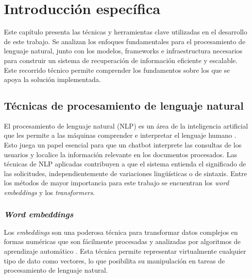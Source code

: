 \chapter{Introducción específica} %

\label{Chapter2}


Este capítulo presenta las técnicas y herramientas clave utilizadas en el 
desarrollo de este trabajo. Se analizan los enfoques fundamentales para el procesamiento de 
lenguaje natural, junto con los modelos, frameworks e infraestructura necesarios para 
construir un sistema de recuperación de información eficiente y escalable. Este recorrido 
técnico permite comprender los fundamentos sobre los que se apoya la solución implementada. 

\section{Técnicas de procesamiento de lenguaje natural}

El procesamiento de lenguaje natural (NLP) es un área de la inteligencia artificial que les permite 
a las máquinas comprender e interpretar el lenguaje humano \citep{book:nlp}. Esto juega un papel esencial 
para que un chatbot interprete las consultas de los usuarios y localice la información relevante en los 
documentos procesados. Las técnicas de NLP aplicadas contribuyen a que el sistema entienda el 
significado de las solicitudes, independientemente de variaciones lingüísticas o de sintaxis. Entre los 
métodos de mayor importancia para este trabajo se encuentran los \textit{word embeddings} y los
\textit{transformers}.

\subsection{\textit{Word embeddings}}

Los \textit{embeddings} son una poderosa técnica para transformar datos complejos en formas numéricas que 
son fácilmente procesadas y analizadas por algoritmos de aprendizaje automático \citep{paper:embeddings}. Esta técnica permite 
representar virtualmente cualquier tipo de dato como vectores, lo que posibilita su manipulación en tareas de 
procesamiento de lenguaje natural.


